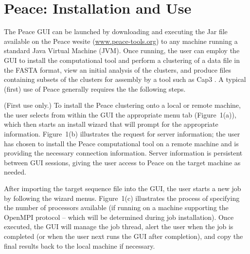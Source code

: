 \documentclass[a4,center,fleqn]{NAR}
\begin{document}
\enlargethispage{-65.1pt}

\section{{\sc Peace}: Installation and Use}

The {\sc Peace} GUI can be launched by downloading and executing the
Jar file available on the {\sc Peace} wesite
(\href{http://www.peace-tools.org}{www.peace-tools.org}) to any
machine running a standard Java Virtual Machine (JVM).  Once running,
the user can employ the GUI to install the computational tool and perform
a clustering of a data file in the FASTA format, view an initial
analysis of the clusters, and produce files containing subsets of the
clusters for assembly by a tool such as {\sc Cap3} \cite{Huang99}.
A typical (first) use of {\sc Peace} generally
requires the the following steps.

 (First use only.)  To install the
{\sc Peace} clustering onto a local or remote machine, the
user selects from within the GUI the appropriate menu tab
(Figure~1(a)), which then starts an install wizard that will prompt
for the appropriate information.  Figure~1(b) illustrates the request
for server information; the user has chosen to install the {\sc Peace}
computational tool on a remote machine and is providing the necessary
connection information.  Server information is persistent between GUI
sessions, giving the user access to {\sc Peace} on the target machine
as needed.

 After importing the target sequence file into
the GUI, the user starts a new job by following the wizard menus.
Figure~1(c) illustrates the process of specifying the number of
processors available (if running on a machine supporting the OpenMPI
protocol -- which will be determined during job installation).  Once
executed, the GUI will manage the job thread, alert the user when the
job is completed (or when the user next runs the GUI after completion),
and copy the final results back to the local machine if necessary.
\end{document}

